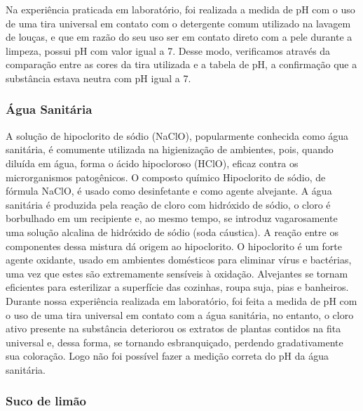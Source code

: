             \indent Na experiência praticada em laboratório, foi realizada a medida de pH com o uso de uma tira universal em contato com o detergente comum utilizado na lavagem de louças, e que em razão do seu uso ser em contato direto com a pele durante a limpeza, possui pH com valor igual a 7. Desse modo, verificamos através da comparação entre as cores da tira utilizada e a tabela de pH, a confirmação que a substância estava neutra com pH igual a 7.\\

        \subsubsection{Água Sanitária}\label{exp2:aguasanitaria}

            \indent A solução de hipoclorito de sódio (NaClO), popularmente conhecida como água sanitária, é comumente utilizada na higienização de ambientes, pois, quando diluída em água, forma o ácido hipocloroso (HClO), eficaz contra os microrganismos patogênicos. O composto químico Hipoclorito de sódio, de fórmula NaClO, é usado como desinfetante e como agente alvejante. A água sanitária é produzida pela reação de cloro com hidróxido de sódio, o cloro é borbulhado em um recipiente e, ao mesmo tempo, se introduz vagarosamente uma solução alcalina de hidróxido de sódio (soda cáustica). A reação entre os componentes dessa mistura dá origem ao hipoclorito. O hipoclorito é um forte agente oxidante, usado em ambientes domésticos para eliminar vírus e bactérias, uma vez que estes são extremamente sensíveis à oxidação. Alvejantes se tornam eficientes para esterilizar a superfície das cozinhas, roupa suja, pias e banheiros.\\

            \indent Durante nossa experiência realizada em laboratório, foi feita a medida de pH com o uso de uma tira universal em contato com a água sanitária, no entanto, o cloro ativo presente na substância deteriorou os extratos de plantas contidos na fita universal e, dessa forma, se tornando esbranquiçado, perdendo gradativamente sua coloração. Logo não foi possível fazer a medição correta do pH da água sanitária.\\

        \subsubsection{Suco de limão}


